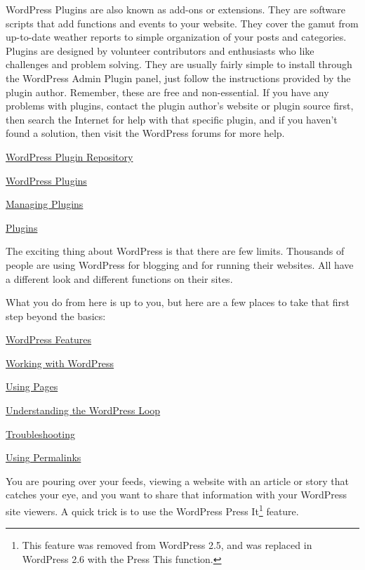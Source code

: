 WordPress Plugins are also known as add-ons or extensions. They are software scripts that add functions and events to your website. They cover the gamut from up-to-date weather reports to simple organization of your posts and categories. Plugins are designed by volunteer contributors and enthusiasts who like challenges and problem solving. They are usually fairly simple to install through the WordPress Admin Plugin panel, just follow the instructions provided by the plugin author. Remember, these are free and non-essential. If you have any problems with plugins, contact the plugin author's website or plugin source first, then search the Internet for help with that specific plugin, and if you haven't found a solution, then visit the WordPress forums for more help.
\begin{compactitem}
\item \href{http://www.wp-plugins.org/}{WordPress Plugin Repository}
\item \href{http://www.wp-plugins.net/}{WordPress Plugins}
\item \href{http://codex.wordpress.org/Managing_Plugins}{Managing Plugins}
\item \href{http://codex.wordpress.org/Plugins}{Plugins}
\end{compactitem}

The exciting thing about WordPress is that there are few limits. Thousands of people are using WordPress for blogging and for running their websites. All have a different look and different functions on their sites.

What you do from here is up to you, but here are a few places to take that first step beyond the basics:
\begin{compactitem}
\item \href{http://codex.wordpress.org/WordPress_Features}{WordPress Features}
\item \href{http://codex.wordpress.org/Working_with_WordPress}{Working with WordPress}
\item \href{http://codex.wordpress.org/Pages}{Using Pages}
\item \href{http://codex.wordpress.org/The_Loop}{Understanding the WordPress Loop}
\item \href{http://codex.wordpress.org/Troubleshooting}{Troubleshooting}
\item \href{http://codex.wordpress.org/Using_Permalinks}{Using Permalinks}
\end{compactitem}

You are pouring over your feeds, viewing a website with an article or story that catches your eye, and you want to share that information with your WordPress site viewers. A quick trick is to use the WordPress Press It\footnote{This feature was removed from WordPress 2.5, and was replaced in WordPress 2.6 with the Press This function.} feature.

